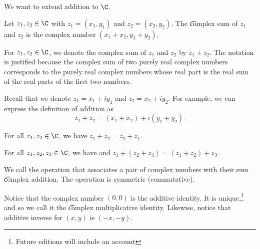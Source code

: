 

We want to extend addition to $\C$.

Let $z_1, z_2 \in \C$ with $z_1 = (x_1, y_1)$ and $z_2 = (x_2, y_2)$.
The \t{complex sum} of $z_1$ and $z_2$ is the complex number $(x_1+x_2,y_1+y_2)$.


For $z_1, z_2 \in \C$, we denote the complex sum of $z_1$ and $z_2$ by $z_1 + z_2$.
The notation is justified because the complex sum of two purely real complex numbers corresponds to the purely real complex numbers whose real part is the real sum of the real parts of the first two numbers.


Recall that we denote $z_1 = x_1 + iy_1$ and $z_2 = x_2 + iy_2$.
For example, we can express the definition of addition as
\[
	z_1 + z_2 = (x_1 + x_2) + i(y_1 + y_2).
\]


\begin{proposition}[Commutativity]
  For all $z_1, z_2 \in \C$, we have $z_1 + z_2 = z_2 + z_1$.
\end{proposition}

\begin{proposition}[Associativity]
  For all $z_1, z_2, z_3 \in \C$, we have and $z_1 + (z_2 + z_3) = (z_1 + z_2) + z_3$.
\end{proposition}


We call the operation that associates a pair of complex numbers with their sum \t{complex addition}.
The operation is symmetric (commutative).


Notice that the complex number $(0, 0)$ is the additive identity.
It is unique,\footnote{Future editions will include an account} and so we call it the \t{complex multiplicative identity.}
Likewise, notice that additive inverse for $(x, y)$ is $(-x, -y)$.


\blankpage

